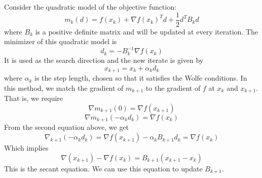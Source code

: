 Consider the quadratic model of the objective function:
$$m_k(d) = f(x_k) + \nabla f(x_k)^T d + \frac{1}{2} d^T B_k d$$
where $B_k$ is a positive definite matrix and will be updated at every iteration. The minimizer of this quadratic model is $$d_k = -B_k^{-1} \nabla f(x_k)$$
It is used as the search direction and the new iterate is given by $$x_{k+1} = x_k + \alpha_k d_k$$
where $\alpha_k$ is the step length, chosen so that it satisfies the Wolfe conditions. In this method, we match the gradient of $m_{k+1}$ to the gradient of $f$ at $x_k$ and $x_{k+1}$. That is, we require
$$\nabla m_{k+1}(0) = \nabla f(x_{k+1})$$
$$\nabla m_{k+1}(-\alpha_k d_k) = \nabla f(x_k)$$
From the second equation above, we get
$$\nabla_{k+1}(-\alpha_k d_k) = \nabla f(x_{k+1}) - \alpha_k B_{k+1} d_k = \nabla f(x_k)$$
Which implies
$$\nabla(x_{k+1}) - \nabla f(x_k) = B_{k+1}(x_{k+1} - x_k)$$
This is the secant equation. We can use this equation to update $B_{k+1}$.



